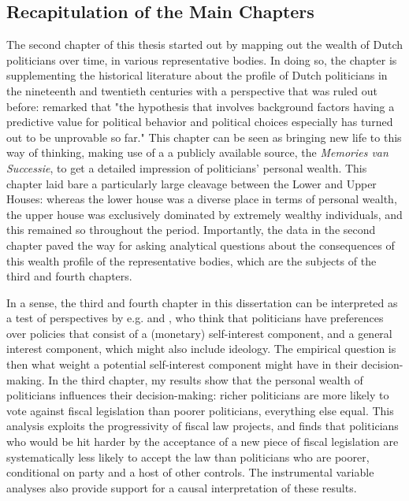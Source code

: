 \subsection{Recapitulation of the Main Chapters}\label{sec:recap}
The second chapter of this thesis started out by mapping out the wealth of Dutch politicians over time, in various representative bodies. In doing so, the chapter is supplementing the historical literature about the profile of Dutch politicians in the nineteenth and twentieth centuries \citep{van1983toegang, secker1991ministers, van1999eerste, oomen2020werk} with a perspective that was ruled out before: \cite{van1983toegang} remarked that "the hypothesis that involves background factors having a predictive value for political behavior and political choices especially has turned out to be unprovable so far." This chapter can be seen as bringing new life to this way of thinking, making use of a a publicly available source, the \textit{Memories van Successie}, to get a detailed impression of politicians' personal wealth. This chapter laid bare a particularly large cleavage between the Lower and Upper Houses: whereas the lower house was a diverse place in terms of personal wealth, the upper house was exclusively dominated by extremely wealthy individuals, and this remained so throughout the period. Importantly, the data in the second chapter paved the way for asking analytical questions about the consequences of this wealth profile of the representative bodies, which are the subjects of the third and fourth chapters. 

In a sense, the third and fourth chapter in this dissertation can be interpreted as a test of perspectives by e.g. \cite{tahoun2019personal} and \cite{grossman1996electoral}, who think that politicians have preferences over policies that consist of a (monetary) self-interest component, and a general interest component, which might also include ideology. The empirical question is then what weight a potential self-interest component might have in their decision-making. In the third chapter, my results show that the personal wealth of politicians influences their decision-making: richer politicians are more likely to vote against fiscal legislation than poorer politicians, everything else equal. This analysis exploits the progressivity of fiscal law projects, and finds that politicians who would be hit harder by the acceptance of a new piece of fiscal legislation are systematically less likely to accept the law than politicians who are poorer, conditional on party and a host of other controls. The instrumental variable analyses also provide support for a causal interpretation of these results. 


